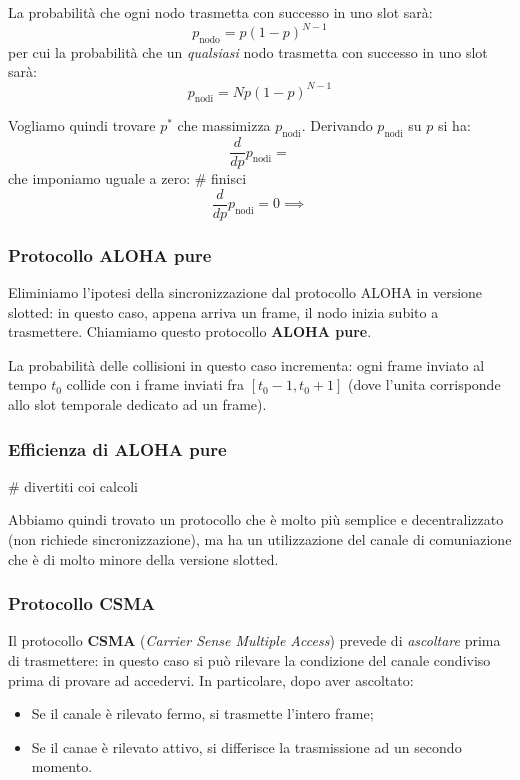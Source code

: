 \documentclass[a4paper,11pt]{article}
\begin{document}
La probabilità che ogni nodo trasmetta con successo in uno slot sarà:
$$
p_\text{nodo} = p(1 - p)^{N - 1}
$$
per cui la probabilità che un \textit{qualsiasi} nodo trasmetta con successo in uno slot sarà:
$$
p_{\text{nodi}} = N p(1 - p)^{N - 1}
$$

Vogliamo quindi trovare $p^*$ che massimizza $p_\text{nodi}$.
Derivando $p_\text{nodi}$ su $p$ si ha:
$$
\frac{d}{dp} p_\text{nodi} = 
$$
che imponiamo uguale a zero: # finisci
$$
\frac{d}{dp} p_\text{nodi} = 0 \implies 
$$

\subsubsection{Protocollo ALOHA pure}
Eliminiamo l'ipotesi della sincronizzazione dal protocollo ALOHA in versione slotted: in questo caso, appena arriva un frame, il nodo inizia subito a trasmettere.
Chiamiamo questo protocollo \textbf{ALOHA pure}.

La probabilità delle collisioni in questo caso incrementa: ogni frame inviato al tempo $t_0$ collide con i frame inviati fra $[t_0 - 1, t_0 + 1]$ (dove l'unita corrisponde allo slot temporale dedicato ad un frame).

\subsubsection{Efficienza di ALOHA pure}
# divertiti coi calcoli

\par\medskip

Abbiamo quindi trovato un protocollo che è molto più semplice e decentralizzato (non richiede sincronizzazione), ma ha un utilizzazione del canale di comuniazione che è di molto minore della versione slotted.

\subsubsection{Protocollo CSMA}
Il protocollo \textbf{CSMA} (\textit{Carrier Sense Multiple Access}) prevede di \textit{ascoltare} prima di trasmettere: in questo caso si può rilevare la condizione del canale condiviso prima di provare ad accedervi.
In particolare, dopo aver ascoltato:
\begin{itemize}
	\item Se il canale è rilevato fermo, si trasmette l'intero frame;
	\item Se il canae è rilevato attivo, si differisce la trasmissione ad un secondo momento.
\end{itemize}
\end{document}
